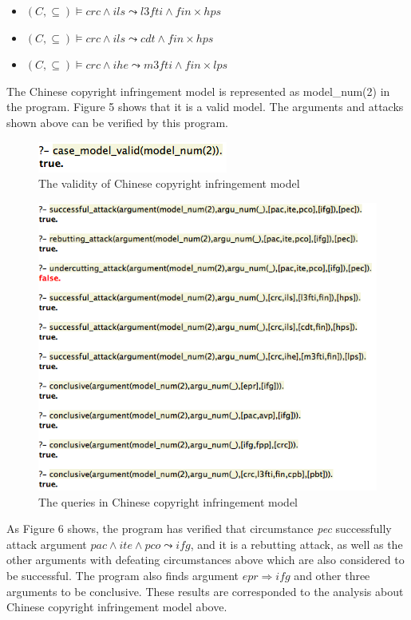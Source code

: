 \documentclass{IOS-Book-Article}
\begin{document}
\begin{itemize}
\item $(C,  \subseteq) \models crc \wedge ils \leadsto l3fti \wedge fin \times hps$
\item $(C,  \subseteq) \models crc \wedge ils \leadsto cdt \wedge fin \times hps$
\item $(C,  \subseteq) \models crc \wedge ihe \leadsto m3fti \wedge fin \times lps$
\end{itemize}

The Chinese copyright infringement model is represented as {\mf model\_num(2)} in the program. Figure 5 shows that it is a valid model. The arguments and attacks shown above can be verified by this program.

\begin{figure} [htbp]
\centering
\includegraphics [scale=0.5] {model2.png}
\caption{The validity of Chinese copyright infringement model}
\end{figure}

\begin{figure} [htbp]
\centering
\includegraphics [scale=0.5] {ex_copyright.png}
\caption{The queries in Chinese copyright infringement model}
\end{figure}

As Figure 6 shows, the program has verified that circumstance \textit{pec} successfully attack argument $pac \wedge ite \wedge pco \leadsto ifg$, and it is a rebutting attack, as well as the other arguments with defeating circumstances above which are also considered to be successful. The program also finds argument $epr \Rightarrow ifg$ and other three arguments to be conclusive. These results are corresponded to the analysis about Chinese copyright infringement model above.
\end{document}
